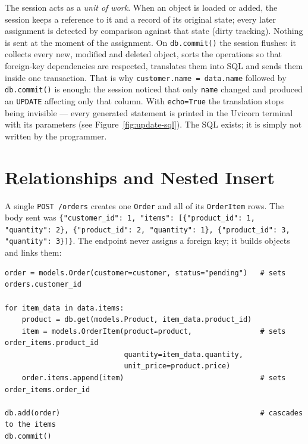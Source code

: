 \documentclass[10pt,a4paper]{article}
\begin{document}
The session acts as a \emph{unit of work}. When an object is loaded or added,
the session keeps a reference to it and a record of its original state; every
later assignment is detected by comparison against that state (dirty tracking).
Nothing is sent at the moment of the assignment. On \texttt{db.commit()} the
session flushes: it collects every new, modified and deleted object, sorts the
operations so that foreign-key dependencies are respected, translates them into
SQL and sends them inside one transaction. That is why
\texttt{customer.name = data.name} followed by \texttt{db.commit()} is enough:
the session noticed that only \texttt{name} changed and produced an
\texttt{UPDATE} affecting only that column. With \texttt{echo=True} the
translation stops being invisible --- every generated statement is printed in
the Uvicorn terminal with its parameters (see Figure~\ref{fig:update-sql}). The
SQL exists; it is simply not written by the programmer.

\section{Relationships and Nested Insert}

A single \texttt{POST /orders} creates one \texttt{Order} and all of its
\texttt{OrderItem} rows. The body sent was
\texttt{\{"customer\_id": 1, "items": [\{"product\_id": 1, "quantity": 2\},
\{"product\_id": 2, "quantity": 1\}, \{"product\_id": 3, "quantity": 3\}]\}}.
The endpoint never assigns a foreign key; it builds objects and links them:

\begin{lstlisting}[style=py]
order = models.Order(customer=customer, status="pending")   # sets orders.customer_id

for item_data in data.items:
    product = db.get(models.Product, item_data.product_id)
    item = models.OrderItem(product=product,                # sets order_items.product_id
                            quantity=item_data.quantity,
                            unit_price=product.price)
    order.items.append(item)                                # sets order_items.order_id

db.add(order)                                               # cascades to the items
db.commit()
\end{lstlisting}
\end{document}
